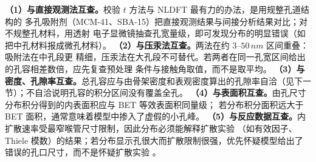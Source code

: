\begin{crosscheck}
\textbf{（1）与直接观测法互查。}校验 $t$ 方法与 NLDFT 最有力的办法，是用规整孔道结构的
多孔吸附剂（MCM-41、SBA-15）把直接观测结果与间接分析结果对比；对不规整孔材料，用透射
电子显微镜抽查孔宽量级，即可发现分布的明显错误（如把中孔材料报成微孔材料）。
\textbf{（2）与压汞法互查。}两法在约 $3$--$50\,\unit{nm}$ 区间重叠：吸附法在中孔段更
精细，压汞法在大孔段不可替代。若两者在同一孔宽区间给出的孔容相差数倍，应先复查预处理
条件与接触角取值，而不是取平均。
\textbf{（3）与密度、孔隙率互查。}总孔容应与由骨架密度和表观密度算出的孔隙率自洽（见下一
节）；不自洽说明孔容的积分区间没有覆盖全孔。
\textbf{（4）与表面积互查。}由孔尺寸分布积分得到的内表面积应与 BET 等效表面积同量级；
若分布积分面积远大于 BET 面积，通常意味着模型中掺入了虚假的小孔峰。
\textbf{（5）与反应数据互查。}内扩散速率受最窄喉管尺寸限制，因此分布必须能解释扩散实验
（如有效因子、Thiele 模数）的结果；若分布显示孔很大而扩散限制很强，优先怀疑模型给出了
错误的孔口尺寸，而不是怀疑扩散实验
。
\end{crosscheck}

